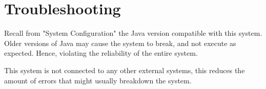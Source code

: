 \documentclass[11pt,a4paper,titlepage]{article}
\begin{document}
\section{Troubleshooting}

Recall from "System Configuration" the Java version compatible with this system. Older versions of Java may cause the system to break, and not execute as expected. Hence, violating the reliability of the entire system.

This system is not connected to any other external systems, this reduces the amount of errors that might usually breakdown the system.
\end{document}
